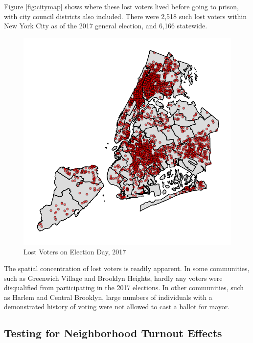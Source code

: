 \documentclass[12pt,]{article}
\begin{document}
Figure \ref{fig:citymap} shows where these lost voters lived before going to prison, with city council districts also included. There were 2,518 such lost voters within New York City as of the 2017 general election, and 6,166 statewide.

\begin{figure}[H]

{\centering \includegraphics{felony_disenfranchisement_nys_files/figure-latex/citywide-map-1} 

}

\caption{\label{fig:citymap}Lost Voters on Election Day, 2017}\label{fig:citywide-map}
\end{figure}

The spatial concentration of lost voters is readily apparent. In some communities, such as Greenwich Village and Brooklyn Heights, hardly any voters were disqualified from participating in the 2017 elections. In other communities, such as Harlem and Central Brooklyn, large numbers of individuals with a demonstrated history of voting were not allowed to cast a ballot for mayor.

\hypertarget{testing-for-neighborhood-turnout-effects}{%
\subsection*{Testing for Neighborhood Turnout Effects}\label{testing-for-neighborhood-turnout-effects}}
\end{document}

